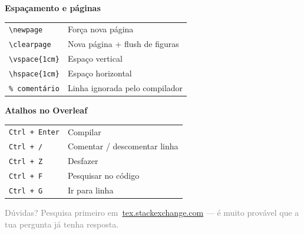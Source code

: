 \documentclass[12pt]{article}
\begin{document}
\begin{mdframed}[style=resourcebox]
\textbf{Espaçamento e páginas}\\[6pt]
\begin{tabular}{@{}ll@{}}
\texttt{\textbackslash newpage}         & Força nova página               \\
\texttt{\textbackslash clearpage}       & Nova página + flush de figuras  \\
\texttt{\textbackslash vspace\{1cm\}}   & Espaço vertical                 \\
\texttt{\textbackslash hspace\{1cm\}}   & Espaço horizontal               \\
\texttt{\% comentário}                  & Linha ignorada pelo compilador  \\
\end{tabular}
\end{mdframed}

\begin{mdframed}[style=resourcebox]
\textbf{Atalhos no Overleaf}\\[6pt]
\begin{tabular}{@{}ll@{}}
\texttt{Ctrl + Enter} & Compilar                       \\
\texttt{Ctrl + /}     & Comentar / descomentar linha   \\
\texttt{Ctrl + Z}     & Desfazer                       \\
\texttt{Ctrl + F}     & Pesquisar no código            \\
\texttt{Ctrl + G}     & Ir para linha                  \\
\end{tabular}
\end{mdframed}

\vspace{0.8cm}
\begin{center}
    \small\textcolor{gray}{
        Dúvidas? Pesquisa primeiro em\
        \href{https://tex.stackexchange.com}{\textcolor{linkblue}{tex.stackexchange.com}}
        — é muito provável que a tua pergunta já tenha resposta.
    }
\end{center}
\end{document}
